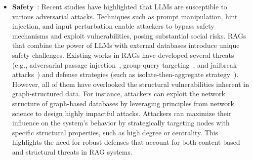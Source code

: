 \begin{itemize}[leftmargin=*]
\begin{itemize}
        \item \textbf{Safety}~\cite{zou2024poisonedragknowledgecorruptionattacks, xue2024badrag, wang2024poisonedlangchainjailbreakllms, deng2024pandorajailbreakgptsretrieval, xiang2024certifiably}: Recent studies have highlighted that LLMs are susceptible to various adversarial attacks. Techniques such as prompt manipulation, hint injection, and input perturbation enable attackers to bypass safety mechanisms and exploit vulnerabilities, posing substantial social risks. RAGs that combine the power of LLMs with external databases introduce unique safety challenges. Existing works in RAGs have developed several threats (e.g., adversarial passage injection~\cite{zou2024poisonedragknowledgecorruptionattacks}, group-query targeting~\cite{xue2024badrag}, and jailbreak attacks~\cite{wang2024poisonedlangchainjailbreakllms, deng2024pandorajailbreakgptsretrieval}) and defense strategies (such as isolate-then-aggregate strategy~\cite{xiang2024certifiably}). However, all of them have overlooked the structural vulnerabilities inherent in graph-structured data. For instance, attackers can exploit the network structure of graph-based databases by leveraging principles from network science to design highly impactful attacks. Attackers can maximize their influence on the system's behavior by strategically targeting nodes with specific structural properties, such as high degree or centrality. This highlights the need for robust defenses that account for both content-based and structural threats in RAG systems. 
        

\end{itemize}
\end{itemize}
